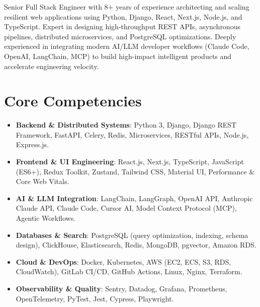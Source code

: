 \documentclass[11pt,a4paper,sans]{moderncv}
\begin{document}
\makecvtitle


\vspace{4pt}
\small{Senior Full Stack Engineer with 8+ years of experience architecting and scaling resilient web applications using Python, Django, React, Next.js, Node.js, and TypeScript. Expert in designing high-throughput REST APIs, asynchronous pipelines, distributed microservices, and PostgreSQL optimizations. Deeply experienced in integrating modern AI/LLM developer workflows (Claude Code, OpenAI, LangChain, MCP) to build high-impact intelligent products and accelerate engineering velocity.}


\section{Core Competencies}
\vspace{1pt}
\begin{itemize}
\item \textbf{Backend \& Distributed Systems}: Python 3, Django, Django REST Framework, FastAPI, Celery, Redis, Microservices, RESTful APIs, Node.js, Express.js.
\item \textbf{Frontend \& UI Engineering}: React.js, Next.js, TypeScript, JavaScript (ES6+), Redux Toolkit, Zustand, Tailwind CSS, Material UI, Performance \& Core Web Vitals.
\item \textbf{AI \& LLM Integration}: LangChain, LangGraph, OpenAI API, Anthropic Claude API, Claude Code, Cursor AI, Model Context Protocol (MCP), Agentic Workflows.
\item \textbf{Databases \& Search}: PostgreSQL (query optimization, indexing, schema design), ClickHouse, Elasticsearch, Redis, MongoDB, pgvector, Amazon RDS.
\item \textbf{Cloud \& DevOps}: Docker, Kubernetes, AWS (EC2, ECS, S3, RDS, CloudWatch), GitLab CI/CD, GitHub Actions, Linux, Nginx, Terraform.
\item \textbf{Observability \& Quality}: Sentry, Datadog, Grafana, Prometheus, OpenTelemetry, PyTest, Jest, Cypress, Playwright.
\end{itemize}

\end{document}
